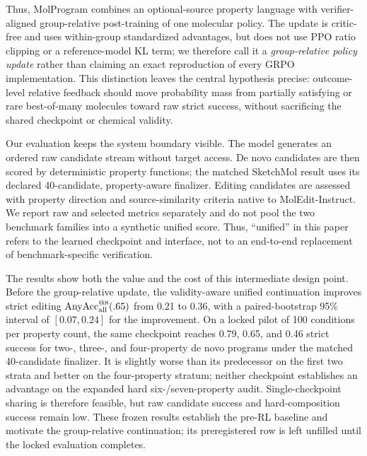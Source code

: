 \documentclass{article}
\begin{document}
Thus, MolProgram combines an optional-source property language with
verifier-aligned group-relative post-training of one molecular policy. The
update is critic-free and uses within-group standardized advantages, but does
not use PPO ratio clipping or a reference-model KL term; we therefore call it a
\emph{group-relative policy update} rather than claiming an exact reproduction
of every GRPO implementation. This distinction leaves the central hypothesis
precise: outcome-level relative feedback should move probability mass from
partially satisfying or rare best-of-many molecules toward raw strict success,
without sacrificing the shared checkpoint or chemical validity.

Our evaluation keeps the system boundary visible. The model generates an
ordered raw candidate stream without target access. De novo candidates are
then scored by deterministic property functions; the matched SketchMol result
uses its declared 40-candidate, property-aware finalizer. Editing candidates
are assessed with property direction and source-similarity criteria native to
MolEdit-Instruct. We report raw and selected metrics separately and do not pool
the two benchmark families into a synthetic unified score. Thus, ``unified''
in this paper refers to the learned checkpoint and interface, not to an
end-to-end replacement of benchmark-specific verification.

The results show both the value and the cost of this intermediate design point.
Before the group-relative update, the validity-aware unified continuation
improves strict editing
$\operatorname{AnyAcc}_{\rm all}^{@8}(.65)$ from 0.21 to 0.36, with a
paired-bootstrap 95\% interval of $[0.07,0.24]$ for the improvement. On a
locked pilot of 100 conditions per property count, the same
checkpoint reaches 0.79, 0.65, and 0.46 strict success for two-, three-, and
four-property de novo programs under the matched 40-candidate finalizer. It is
slightly worse than its predecessor on the first two strata and better on the
four-property stratum; neither checkpoint establishes an advantage on the
expanded hard six-/seven-property audit. Single-checkpoint sharing is therefore
feasible, but raw candidate success and hard-composition success remain low.
These frozen results establish the pre-RL baseline and motivate the
group-relative continuation; its preregistered row is left unfilled until the
locked evaluation completes.
\end{document}
